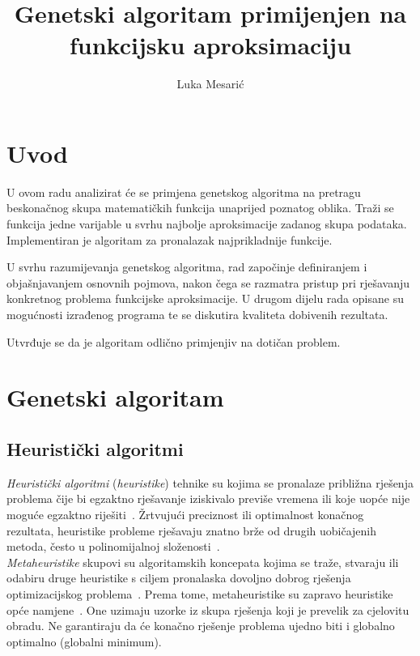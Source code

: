 \documentclass[times, utf8, seminar, numeric]{fer}
\begin{document}
\nocite{*}

\title{Genetski algoritam primijenjen na funkcijsku aproksimaciju}

\author{Luka Mesarić}


\maketitle

\tableofcontents

\chapter{Uvod}

U ovom radu analizirat će se primjena genetskog algoritma na pretragu beskonačnog skupa matematičkih funkcija unaprijed poznatog oblika.
Traži se funkcija jedne varijable u svrhu najbolje aproksimacije zadanog skupa podataka.
Implementiran je algoritam za pronalazak najprikladnije funkcije.

U svrhu razumijevanja genetskog algoritma, rad započinje definiranjem i objašnjavanjem osnovnih pojmova, nakon čega se razmatra pristup pri rješavanju konkretnog problema funkcijske aproksimacije.
U drugom dijelu rada opisane su mogućnosti izrađenog programa te se diskutira kvaliteta dobivenih rezultata.

Utvrđuje se da je algoritam odlično primjenjiv na dotičan problem.


\chapter{Genetski algoritam}

\section{Heuristički algoritmi}

\textit{Heuristički algoritmi} (\textit{heuristike}) tehnike su kojima se pronalaze približna rješenja problema čije bi egzaktno rješavanje iziskivalo previše vremena ili koje uopće nije moguće egzaktno riješiti~\cite{Cupic}.
Žrtvujući preciznost ili optimalnost konačnog rezultata, heuristike probleme rješavaju znatno brže od drugih uobičajenih metoda, često u polinomijalnoj složenosti~\cite{WikiHeuristic}.\\

\textit{Metaheuristike} skupovi su algoritamskih koncepata kojima se traže, stvaraju ili odabiru druge heuristike s ciljem pronalaska dovoljno dobrog rješenja optimizacijskog problema~\cite{WikiMetaheuristic}.
Prema tome, metaheuristike su zapravo heuristike opće namjene~\cite{Cupic}.
One uzimaju uzorke iz skupa rješenja koji je prevelik za cjelovitu obradu.
Ne garantiraju da će konačno rješenje problema ujedno biti i globalno optimalno (globalni minimum).
\end{document}
